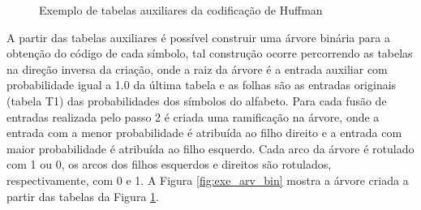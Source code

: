 \begin{figure}[ht]
    \begin{center}
        \caption{Exemplo de tabelas auxiliares da codificação de Huffman}
        \label{fig:exe_tab_aux}
    \end{center}
\end{figure}

A partir das tabelas auxiliares é possível construir uma árvore binária para a obtenção do código de cada símbolo, tal construção ocorre percorrendo as tabelas na direção inversa da criação, onde a raiz da árvore é a entrada auxiliar com probabilidade igual a 1.0 da última tabela e as folhas são as entradas originais (tabela T1) das probabilidades dos símbolos do alfabeto. Para cada fusão de entradas realizada pelo passo 2 é criada uma ramificação na árvore, onde a entrada com a menor probabilidade é atribuída ao filho direito e a entrada com maior probabilidade é atribuída ao filho esquerdo. Cada arco da árvore é rotulado com 1 ou 0, os arcos dos filhos esquerdos e direitos são rotulados, respectivamente, com 0 e 1. A Figura \ref{fig:exe_arv_bin} mostra a árvore criada a partir das tabelas da Figura \ref{fig:exe_tab_aux}.

